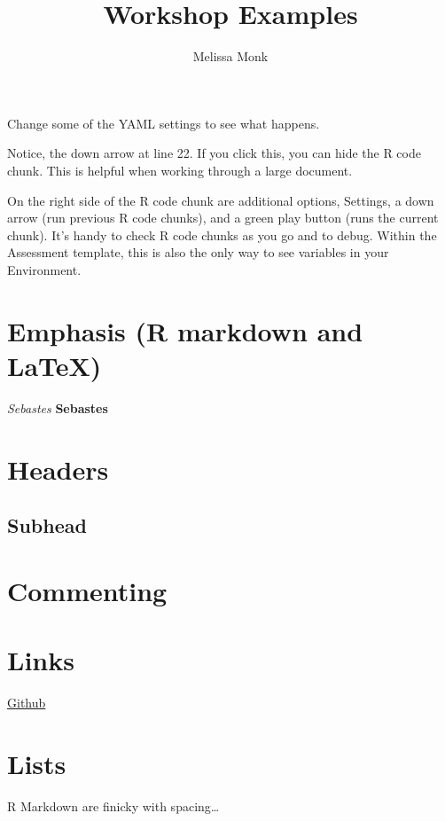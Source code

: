 \documentclass[12pt,]{article}
\title{Workshop Examples}
\author{Melissa Monk}
\date{}
\begin{document}
\maketitle

{
\setcounter{tocdepth}{4}
\tableofcontents
}
Change some of the YAML settings to see what happens.

Notice, the down arrow at line 22. If you click this, you can hide the R
code chunk. This is helpful when working through a large document.

On the right side of the R code chunk are additional options, Settings,
a down arrow (run previous R code chunks), and a green play button (runs
the current chunk). It's handy to check R code chunks as you go and to
debug. Within the Assessment template, this is also the only way to see
variables in your Environment.

\section{Emphasis (R markdown and
LaTeX)}\label{emphasis-r-markdown-and-latex}

\emph{Sebastes} \linebreak
\textbf{Sebastes}

\section{Headers}\label{headers}

\subsection*{Subhead}\label{subhead}

\section{Commenting}\label{commenting}

\section{Links}\label{links}

\href{http://www.github.com}{Github}

\section{Lists}\label{lists}

R Markdown are finicky with spacing\ldots{}
\end{document}

